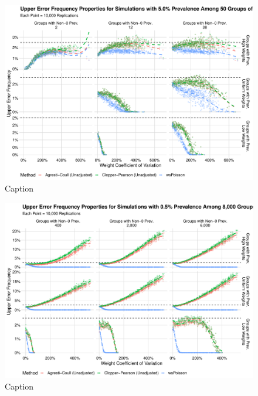 \documentclass[AMA,STIX1COL]{WileyNJD-v2}
\begin{document}
\begin{figure}
    \centering
    \includegraphics[width=\textwidth]{figures/perfect_upper_error_frequency_50_0_05_reduced.pdf}
    \caption{Caption}
    \label{fig:perfect_upper_error_frequency_50_0_05_reduced}
\end{figure}


\begin{figure}
    \centering
    \includegraphics[width=\textwidth]{figures/perfect_upper_error_frequency_8000_0_005_reduced.pdf}
    \caption{Caption}
    \label{fig:perfect_upper_error_frequency_8000_0_005_reduced}
\end{figure}
\end{document}
